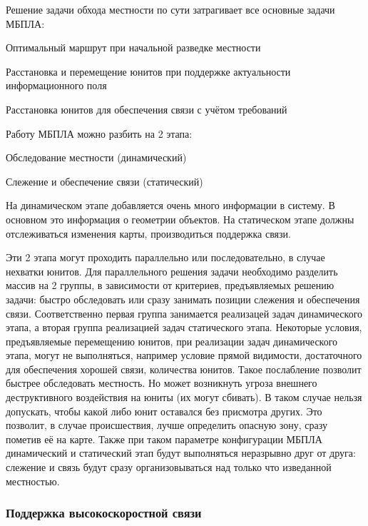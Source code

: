 Решение задачи обхода местности по сути затрагивает все основные задачи
МБПЛА:

\begin{mintemize}
\item Оптимальный маршрут при начальной разведке местности
\item Расстановка и перемещение юнитов при поддержке
    актуальности информационного поля
\item Расстановка юнитов для обеспечения связи с учётом требований
\end{mintemize}

Работу МБПЛА можно разбить на 2 этапа:
\begin{mintemize}
\item Обследование местности (динамический)
\item Слежение и обеспечение связи (статический)
\end{mintemize}

На динамическом этапе добавляется очень много информации в систему.
В основном это информация о геометрии объектов. На статическом этапе
должны отслеживаться изменения карты, производиться поддержка связи.

Эти 2 этапа могут проходить параллельно или последовательно, в случае
нехватки юнитов. Для параллельного решения задачи необходимо разделить
массив на 2 группы, в зависимости от критериев, предъявляемых 
решению задачи: быстро обследовать или сразу занимать позиции слежения и 
обеспечения связи. Соответственно первая группа занимается реализацей
задач динамического этапа, а вторая группа реализацией задач
статического этапа. Некоторые условия, предъявляемые перемещению юнитов,
при реализации задач динамического этапа, могут не выполняться, например
условие прямой видимости, достаточного для обеспечения хорошей связи,
количества юнитов. Такое послабление позволит быстрее обследовать
местность. Но может возникнуть угроза внешнего деструктивного воздействия
на юниты (их могут сбивать). В таком случае нельзя допускать, чтобы 
какой либо юнит оставался без присмотра других. Это позволит, в случае
происшествия, лучше определить опасную зону, сразу пометив её на карте.
Также при таком параметре конфигурации МБПЛА динамический и статический
этап будут выполняться неразрывно друг от друга: слежение и связь будут
сразу организовываться над только что изведанной местностью.

\subsubsection{Поддержка высокоскоростной связи}

